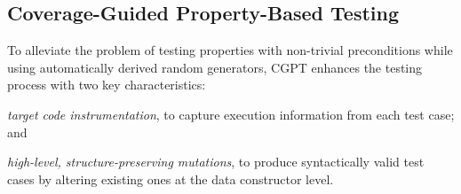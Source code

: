 \documentclass[sigconf,review,anonymous]{acmart}
\newcommand{\fuzzchick}{\textit{FuzzChick}\xspace}
\begin{document}




\subsection{Coverage-Guided Property-Based Testing}

To alleviate the problem of testing properties with non-trivial preconditions
while using automatically derived random generators, CGPT
%
%
enhances the testing process with two key characteristics:
%
\begin{inparaenum}
\item \emph{target code instrumentation}, to capture execution information from
  each test case; and
\item \emph{high-level, structure-preserving mutations}, to produce
  syntactically valid test cases by altering existing ones at the data
  constructor level.
\end{inparaenum}
\end{document}

